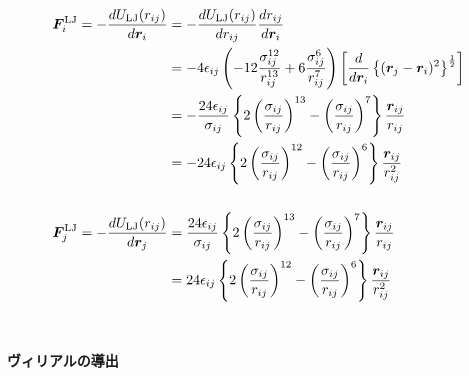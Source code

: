 \begin{align}
   \bm{F}_{i}^{\mathrm{LJ}}
 =
   -\frac{d U_{\mathrm{LJ}} (r_{ij})}{d \bm{r}_{i}}
 &=
   -\frac{d U_{\mathrm{LJ}}(r_{ij})}{d r_{ij}}
    \frac{d r_{ij}}{d \bm{r}_{i}}
 \notag
 \\
 &=
   -4\epsilon_{ij}
    \left(
           -12\frac{\sigma_{ij}^{12}}{r_{ij}^{13}}
           + 6\frac{\sigma_{ij}^{6}}{r_{ij}^{7}}
    \right)
    \left[
           \frac{d}{d \bm{r}_{i}}
           \left\{
                  (\bm{r}_{j} - \bm{r}_{i})^{2}
           \right\}^{\frac{1}{2}}
    \right]
 \notag
 \\
 &=
   -\frac{24\epsilon_{ij}}{\sigma_{ij}}
   \left\{
           2\left( \frac{\sigma_{ij}}{r_{ij}} \right)^{13}
           -\left( \frac{\sigma_{ij}}{r_{ij}} \right)^{7}
   \right\}
   \frac{\bm{r}_{ij}}{r_{ij}}
 \notag
 \\
 &=
   -24\epsilon_{ij}
   \left\{
           2\left( \frac{\sigma_{ij}}{r_{ij}} \right)^{12}
           -\left( \frac{\sigma_{ij}}{r_{ij}} \right)^{6}
   \right\}
   \frac{\bm{r}_{ij}}{r_{ij}^{2}}
 \notag
 \\
 \notag
 \\
 \bm{F}_{j}^{\mathrm{LJ}}
 =
   -\frac{d U_{\mathrm{LJ}} (r_{ij})}{d \bm{r}_{j}}
 &=
   \frac{24\epsilon_{ij}}{\sigma_{ij}}
   \left\{
           2\left( \frac{\sigma_{ij}}{r_{ij}} \right)^{13}
           -\left( \frac{\sigma_{ij}}{r_{ij}} \right)^{7}
   \right\}
   \frac{\bm{r}_{ij}}{r_{ij}}
 \notag
 \\
 &=
   24\epsilon_{ij}
   \left\{
           2\left( \frac{\sigma_{ij}}{r_{ij}} \right)^{12}
           -\left( \frac{\sigma_{ij}}{r_{ij}} \right)^{6}
   \right\}
   \frac{\bm{r}_{ij}}{r_{ij}^{2}}
 \notag
\end{align}
\\

\paragraph{ヴィリアルの導出}

